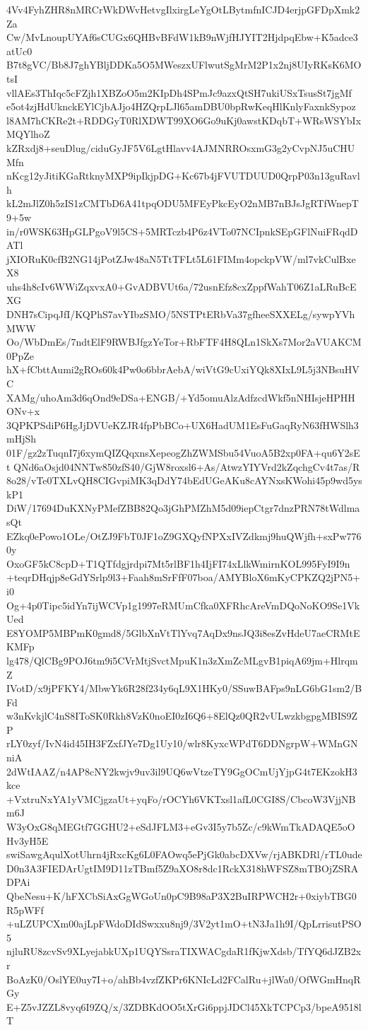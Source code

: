 4Vv4FyhZHR8nMRCrWkDWvHetvgIlxirgLeYgOtLBytmfnICJD4erjpGFDpXmk2Za
Cw/MvLnoupUYAf6sCUGx6QHBvBFdW1kB9nWjfHJYIT2HjdpqEbw+K5adce3atUc0
B7t8gVC/Bb8J7ghYBljDDKa5O5MWeszxUFlwutSgMrM2P1x2nj8UIyRKsK6MOtsI
vllAEs3ThIqc5cFZjh1XBZoO5m2KIpDh4SPmJc9azxQtSH7ukiUSxTsusSt7jgMf
e5ot4zjHdUknckEYlCjbAJjo4HZQrpLJl65amDBU0bpRwKeqHlKnlyFaxnkSypoz
l8AM7hCKRe2t+RDDGyT0RlXDWT99XO6Go9uKj0awstKDqbT+WRsWSYbIxMQYlhoZ
kZRxdj8+seuDlug/ciduGyJF5V6LgtHlavv4AJMNRROsxmG3g2yCvpNJ5uCHUMfn
nKcg12yJitiKGaRtknyMXP9ipIkjpDG+Kc67b4jFVUTDUUD0QrpP03n13guRavlh
kL2mJlZ0h5zIS1zCMTbD6A41tpqODU5MFEyPkcEyO2nMB7nBJsJgRTfWnepT9+5w
in/r0WSK63HpGLPgoV9l5CS+5MRTczb4P6z4VTo07NCIpnkSEpGFlNuiFRqdDATl
jXIORuK0cfB2NG14jPotZJw48aN5TtTFLt5L61FIMm4opckpVW/ml7vkCulBxeX8
uhs4h8cIv6WWiZqxvxA0+GvADBVUt6a/72usnEfz8cxZppfWahT06Z1aLRuBcEXG
DNH7sCipqJfI/KQPhS7avYIbzSMO/5NSTPtERbVa37gfheeSXXELg/sywpYVhMWW
Oo/WbDmEs/7ndtElF9RWBJfgzYeTor+RbFTF4H8QLn1SkXs7Mor2aVUAKCM0PpZe
hX+fCbttAumi2gROs60k4Pw0o6bbrAebA/wiVtG9cUxiYQk8XIxL9L5j3NBsuHVC
XAMg/uhoAm3d6qOnd9eDSa+ENGB/+Yd5omuAlzAdfzcdWkf5nNHIsjeHPHHONv+x
3QPKPSdiP6HgJjDVUeKZJR4fpPbBCo+UX6HadUM1EsFuGaqRyN63fHWSlh3mHjSh
01F/gz2zTuqnI7j6xymQIZQqxnsXepeogZhZWMSbu54VuoA5B2xp0FA+qu6Y2sEt
QNd6aOsjd04NNTw850zfS40/GjW8roxsl6+As/AtwzYIYVrd2kZqchgCv4t7as/R
8o28/vTe0TXLvQH8CIGvpiMK3qDdY74bEdUGeAKu8cAYNxsKWohi45p9wd5yskP1
DiW/17694DuKXNyPMefZBB82Qo3jGhPMZhM5d09iepCtgr7dnzPRN78tWdlmasQt
EZkq0ePowo1OLe/OtZJ9FbT0JF1oZ9GXQyfNPXxIVZdkmj9huQWjfh+sxPw7760y
OxoGF5kC8cpD+T1QTfdgjrdpi7Mt5rlBF1h4IjFI74xLlkWmirnKOL995FyI9I9n
+teqrDHqjp8eGdYSrlp9l3+Faah8mSrFfF07boa/AMYBloX6mKyCPKZQ2jPN5+i0
Og+4p0Tipc5idYn7ijWCVp1g1997eRMUmCfka0XFRhcAreVmDQoNoKO9Se1VkUed
E8YOMP5MBPmK0gmd8/5GlbXnVtTlYvq7AqDx9nsJQ3i8esZvHdeU7aeCRMtEKMFp
lg478/QlCBg9POJ6tm9i5CVrMtjSvctMpuK1n3zXmZcMLgvB1piqA69jm+HlrqmZ
IVotD/x9jPFKY4/MbwYk6R28f234y6qL9X1HKy0/SSuwBAFps9nLG6bG1sm2/BFd
w3nKvkjlC4nS8IToSK0Rkh8VzK0noEI0zI6Q6+8ElQz0QR2vULwzkbgpgMBIS9ZP
rLY0zyf/IvN4id45IH3FZxfJYe7Dg1Uy10/wlr8KyxcWPdT6DDNgrpW+WMnGNniA
2dWtIAAZ/n4AP8cNY2kwjv9uv3il9UQ6wVtzeTY9GgOCmUjYjpG4t7EKzokH3kce
+VxtruNxYA1yVMCjgzaUt+yqFo/rOCYh6VKTxsl1afL0CGI8S/CbcoW3VjjNBm6J
W3yOxG8qMEGtf7GGHU2+eSdJFLM3+eGv3I5y7b5Zc/c9kWmTkADAQE5oOHv3yH5E
swiSawgAqulXotUhrn4jRxcKg6L0FAOwq5ePjGk0abcDXVw/rjABKDRl/rTL0ude
D0n3A3FIEDArUgtIM9D11zTBmf5Z9aXO8r8dc1RckX318hWFSZ8mTBOjZSRADPAi
QbeNesu+K/hFXCbSiAxGgWGoUn0pC9B98aP3X2BuIRPWCH2r+0xiybTBG0R5pWFf
+uLZUPCXm00ajLpFWdoDIdSwxxu8nj9/3V2yt1mO+tN3Ja1h9I/QpLrrisutPSO5
njluRU8zcvSv9XLyejabkUXp1UQYSsraTIXWACgdaR1fKjwXdsb/TfYQ6dJZB2xr
BoAzK0/OslYE0uy7I+o/ahBb4vzfZKPr6KNIcLd2FCalRu+jlWa0/OfWGmHnqRGy
E+Z5vJZZL8vyq6I9ZQ/x/3ZDBKdOO5tXrGi6ppjJDCl45XkTCPCp3/bpeA9518lT
